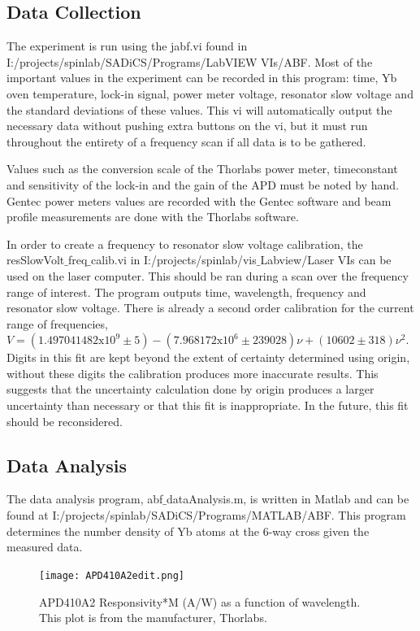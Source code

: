 \documentclass[12pt, a4paper]{article}
\begin{document}
\subsection{Data Collection}
The experiment is run using the jabf.vi found in \footnotesize I:/projects/spinlab/SADiCS/Programs/LabVIEW VIs/ABF. \normalsize Most of the important values in the experiment can be recorded in this program: time, Yb oven temperature, lock-in signal, power meter voltage, resonator slow voltage and the standard deviations of these values. This vi will automatically output the necessary data without pushing extra buttons on the vi, but it must run throughout the entirety of a frequency scan if all data is to be gathered. 

Values such as the conversion scale of the Thorlabs power meter, timeconstant and sensitivity of the lock-in and the gain of the APD must be noted by hand. Gentec power meters values are recorded with the Gentec software and beam profile measurements are done with the Thorlabs software.

In order to create a frequency to resonator slow voltage calibration, the \\resSlowVolt$\_$freq$\_$calib.vi in \footnotesize I:/projects/spinlab/vis$\_$Labview/Laser VIs \normalsize can be used on the laser computer. This should be ran during a scan over the frequency range of interest. The program outputs time, wavelength, frequency and resonator slow voltage. There is already a second order calibration for the current range of frequencies, $V = (1.497041482\mathrm{x}10^{9} \pm 5) - (7.968172\mathrm{x}10^{6} \pm 239028)\nu + (10602 \pm 318) \nu^2$. Digits in this fit are kept beyond the extent of certainty determined using origin, without these digits the calibration produces more inaccurate results. This suggests that the uncertainty calculation done by origin produces a larger uncertainty than necessary or that this fit is inappropriate. In the future, this fit should be reconsidered. 

\subsection{Data Analysis}
The data analysis program, abf$\_$dataAnalysis.m,  is written in Matlab and can be found at \footnotesize I:/projects/spinlab/SADiCS/Programs/MATLAB/ABF. \normalsize This program determines the number density of Yb atoms at the 6-way cross given the measured data.

\begin{figure}
  \vspace*{-4mm}
  \texttt{[image: APD410A2edit.png]}
  \vspace*{-6mm}
  \caption{APD410A2 Responsivity*M (A/W) as a function of wavelength. This plot is from the manufacturer, Thorlabs.}
\end{figure}
\end{document}
